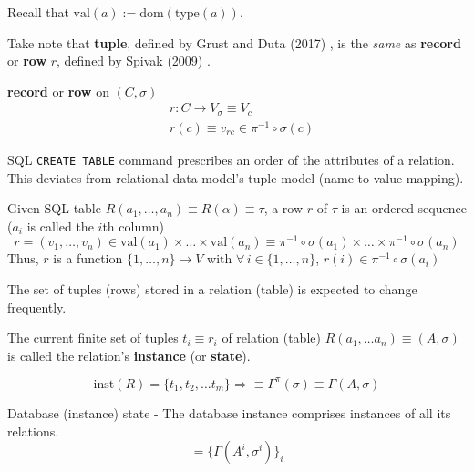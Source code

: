 Recall that $\text{val}(a) := \text{dom}(\text{type}(a))$.

Take note that \textbf{tuple}, defined by Grust and Duta (2017) \cite{agat:GrDu2017}, is the \emph{same} as \textbf{record} or \textbf{row} $r$, defined by Spivak (2009) \cite{agat:Spiv2009}.

\begin{definition}
	\textbf{record} or \textbf{row} on $(C, \sigma)$
	\begin{equation}
	\begin{aligned}
	& r: C \to V_{\sigma} \equiv V_c \\ 
	& r(c) \equiv v_{rc} \in \pi^{-1}\circ \sigma(c)
	\end{aligned}
	\end{equation}
\end{definition} 

SQL \texttt{CREATE TABLE} command prescribes an order of the attributes of a relation. This deviates from relational data model's tuple model (name-to-value mapping).

\begin{definition}[Row]
	Given SQL table $R(a_1, \dots, a_n) \equiv R(\alpha) \equiv \tau$, a row $r$ of $\tau$ is an ordered sequence ($a_i$ is called the $i$th column)
	\begin{equation}
	r = (v_1, \dots, v_n) \in \text{val}(a_1) \times \dots \times \text{val}(a_n) \equiv \pi^{-1} \circ \sigma(a_1) \times \dots \times \pi^{-1} \circ \sigma(a_n)
	\end{equation}
	Thus, $r$ is a function $\lbrace 1, \dots , n \rbrace \to V$ with $\forall \, i \in \lbrace 1 , \dots , n \rbrace$, $r(i) \in \pi^{-1} \circ \sigma(a_i)$
\end{definition}

The set of tuples (rows) stored in a relation (table) is expected to change frequently.

\begin{definition}
	The current finite set of tuples $t_i \equiv r_i$ of relation (table) $R(a_1, \dots a_n) \equiv (A, \sigma)$ is called the relation's \textbf{instance} (or \textbf{state}).

\[
\text{inst}(R) = \lbrace t_1 , t_2 , \dots t_m \rbrace \Longrightarrow \equiv \Gamma^{\pi}(\sigma) \equiv \Gamma(A, \sigma)
\]

Database (instance) state - The database instance comprises instances of all its relations.
\[
= \lbrace \Gamma(A^i, \sigma^i) \rbrace_i
\]
\end{definition} 

